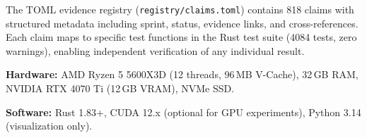 \documentclass[12pt]{article}
\theoremstyle{definition}
\theoremstyle{plain}
\theoremstyle{remark}
\begin{document}
The TOML evidence registry (\texttt{registry/claims.toml}) contains 818
claims with structured metadata including sprint, status, evidence links,
and cross-references.  Each claim maps to specific test functions in the
Rust test suite (4084 tests, zero warnings), enabling independent
verification of any individual result.

\textbf{Hardware:} AMD Ryzen 5 5600X3D (12 threads, 96\,MB V-Cache), 32\,GB RAM,
NVIDIA RTX 4070 Ti (12\,GB VRAM), NVMe SSD.

\textbf{Software:} Rust 1.83+, CUDA 12.x (optional for GPU experiments),
Python 3.14 (visualization only).



\end{document}
